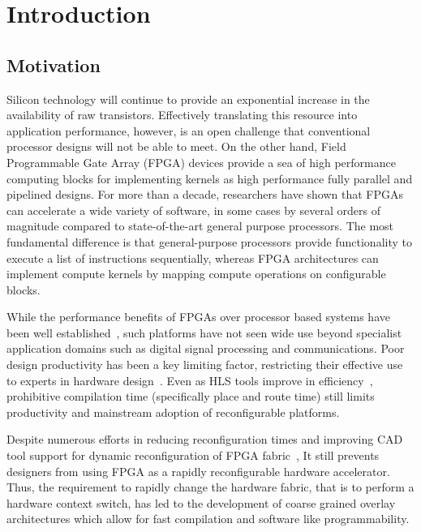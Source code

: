 \chapter{Introduction}
\label{ch1_introduction}
\section{Motivation}
Silicon technology will continue to provide an exponential increase in the availability of raw transistors. 
Effectively translating this resource into application performance, however, is an open challenge that conventional processor designs will not be able to meet. 
On the other hand, Field Programmable Gate Array (FPGA) devices provide a sea of high performance computing blocks for implementing kernels as high performance fully parallel and pipelined designs.
For more than a decade, researchers have shown that FPGAs can accelerate a wide variety of software, in some cases by several orders of magnitude compared to state-of-the-art general purpose processors.
The most fundamental difference is that general-purpose processors provide functionality to execute a list of instructions sequentially, whereas FPGA architectures can implement compute kernels by mapping compute operations on configurable blocks.

While the performance benefits of FPGAs over processor based systems have been well established~\cite{compton_reconfig_2002,tessier2015reconfigurable,dehon2015fundamental,trimberger2015three}, such platforms have not seen wide use beyond specialist application domains such as digital signal processing and communications.
Poor design productivity has been a key limiting factor, restricting their effective use to experts in hardware design~\cite{stitt2011field}. 
Even as \ac{HLS} tools improve in efficiency~\cite{canis_legup:_2011,liang_high-level_2012}, prohibitive compilation time (specifically place and route time) still limits productivity and mainstream adoption of reconfigurable platforms.

Despite numerous efforts in reducing reconfiguration times and improving CAD tool support for dynamic reconfiguration of FPGA fabric~\cite{vipin2012,vipin_high_2012,vipin2013,vipin_automated_2014,vipin_zycap_2014}, It still prevents designers from using FPGA as a rapidly reconfigurable hardware accelerator.
Thus, the requirement to rapidly change the hardware fabric, that is to perform a hardware context switch, has led to the development of coarse grained overlay architectures which allow for fast compilation and software like
programmability.


